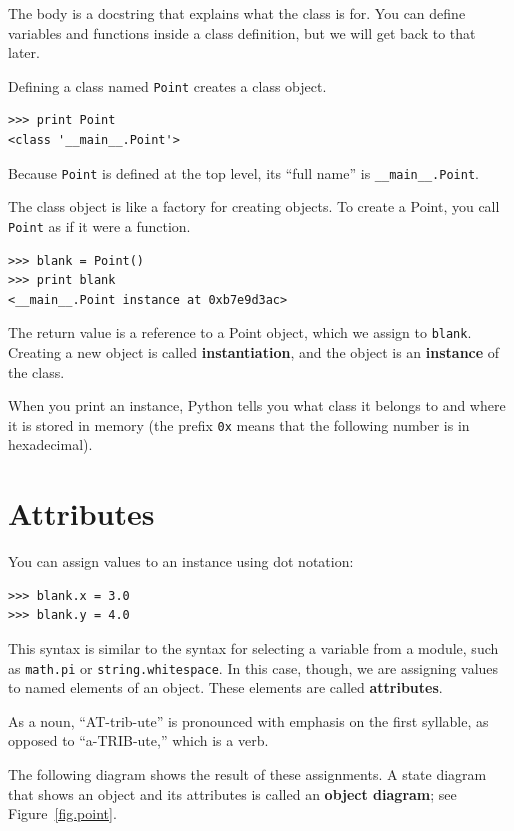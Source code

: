 \documentclass[10pt]{book}
\begin{document}
\begin{CJK}{UTF8}{gbsn}
The body is a docstring that explains what the class is for.
You can define variables and functions inside a class definition,
but we will get back to that later.

Defining a class named {\tt Point} creates a class object.

\begin{verbatim}
>>> print Point
<class '__main__.Point'>
\end{verbatim}
%
Because {\tt Point} is defined at the top level, its ``full
name'' is \verb"__main__.Point".

The class object is like a factory for creating objects.  To create a
Point, you call {\tt Point} as if it were a function.

\begin{verbatim}
>>> blank = Point()
>>> print blank
<__main__.Point instance at 0xb7e9d3ac>
\end{verbatim}
%
The return value is a reference to a Point object, which we
assign to {\tt blank}.  
Creating a new object is called
{\bf instantiation}, and the object is an {\bf instance} of
the class.

When you print an instance, Python tells you what class it
belongs to and where it is stored in memory (the prefix
{\tt 0x} means that the following number is in hexadecimal).


\section{Attributes}
\label{attributes}

You can assign values to an instance using dot notation:

\begin{verbatim}
>>> blank.x = 3.0
>>> blank.y = 4.0
\end{verbatim}
%
This syntax is similar to the syntax for selecting a variable from a
module, such as {\tt math.pi} or {\tt string.whitespace}.  In this case,
though, we are assigning values to named elements of an object.
These elements are called {\bf attributes}.

As a noun, ``AT-trib-ute'' is pronounced with emphasis on the first
syllable, as opposed to ``a-TRIB-ute,'' which is a verb.

The following diagram shows the result of these assignments.
A state diagram that shows an object and its attributes is
called an {\bf object diagram}; see Figure~\ref{fig.point}.


\end{CJK}
\end{document}
